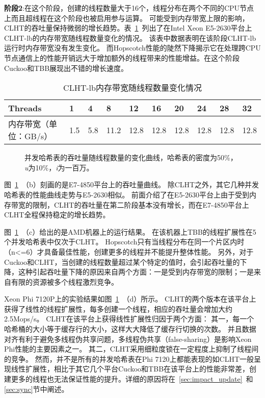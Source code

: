 \textbf{阶段2}:在这个阶段，创建的线程数量大于16个，线程分布在两个不同的CPU节点上而且超线程在这个阶段也被启用参与运算。
可能受到内存带宽上限的影响，CLHT的吞吐量保持微弱的增长趋势。表~\ref{tab:mem_bandwidth}~列出了在Intel Xeon E5-2630平台上CLHT-lb的内存带宽随线程数量变化的情况。
该表中数据表明在该阶段CLHT-lb运行时内存带宽没有发生变化。
而Hopscotch性能的陡然下降揭示它在处理跨CPU节点通信上的性能开销远大于增加额外的线程带来的性能增益。在这个阶段Cuckoo和TBB展现出不错的增长速度。

\begin{table}[htbp]
  \centering
  \caption{CLHT-lb内存带宽随线程数量变化情况}
  \label{tab:mem_bandwidth}
  \begin{tabular}{llllllllll}
    \toprule
       Threads & 1 & 4 & 8 & 12 & 16 & 20 & 24 & 28 & 32 \\
    \midrule
      内存带宽（单位：GB/s） & 1.5 & 5.8 & 11.2 & 12.8 & 12.8 & 12.8 & 12.8 & 12.8 & 12.8 \\ 
    \bottomrule
  \end{tabular}
\end{table}


\begin{figure}[htbp]
\centering
\caption{并发哈希表的吞吐量随线程数量的变化曲线，哈希表的密度为50\%，\textit{u}为10\%，\textit{i}为一百万。}
\label{fig:thread_scal}
\end{figure}

图~\ref{fig:thread_scal}~（b）刻画的是E7-4850平台上的吞吐量曲线。
除CLHT之外，其它几种并发哈希表的性能曲线走势与E5-2630相似。
前面介绍了在E5-2630平台上由于受到内存带宽的限制，CLHT的吞吐量在第二阶段基本没有增长，而在E7-4850平台上CLHT全程保持稳定的增长趋势。

图~\ref{fig:thread_scal}~（c）给出的是AMD机器上的运行结果。
在该机器上TBB的线程扩展性在5个并发哈希表中仅次于CLHT。
Hopscotch只有当线程分布在同一个片区内时（n<=6）才具备最佳性能，创建更多的线程并不能提升整体性能。
另外，对于Cuckoo和CLHT，当创建的线程数量超过某个特定的值时，会引起吞吐量的下降，这种引起吞吐量下降的原因来自两个方面：一是受到内存带宽的限制；一是来自有限的资源被多个线程激烈竞争。

Xeon Phi 7120P上的实验结果如图~\ref{fig:thread_scal}~（d）所示。
CLHT的两个版本在该平台上获得了线性的线程扩展性，每多创建一个线程，相应的吞吐量会增加大约2.5Mops/s。 
CLHT在该平台上获得线性扩展性归因于两个方面：
其一，每一个哈希桶的大小等于缓存行的大小，这样大大降低了缓存行切换的次数。
并且数据对齐有利于避免多线程伪共享问题，多线程伪共享（false-sharing）是影响Xeon Phi性能的主要因素之一。
其二，CLHT采用细粒度锁在一定程度上抑制了线程间的竞争。
然而，并不是所有的并发哈希表在Phi 7120上都能表现的如CLHT一般呈现线性扩展性，相比于其它几个平台Cuckoo和TBB在该平台上的性能非常差，创建更多的线程也无法保证性能的提升。详细的原因将在~\ref{sec:impact_update}~和\ref{sec:sync}节中阐述。

